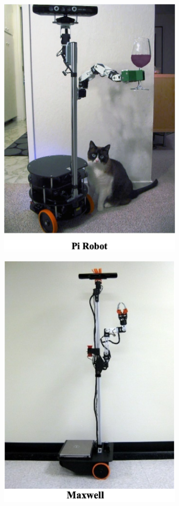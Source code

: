 \includegraphics[width=9cm]{.gitbook/assets/snimok-ekrana-2020-05-29-v-21.29.59.png}

\includegraphics[width=9cm]{.gitbook/assets/snimok-ekrana-2020-05-29-v-21.29.44.png}

